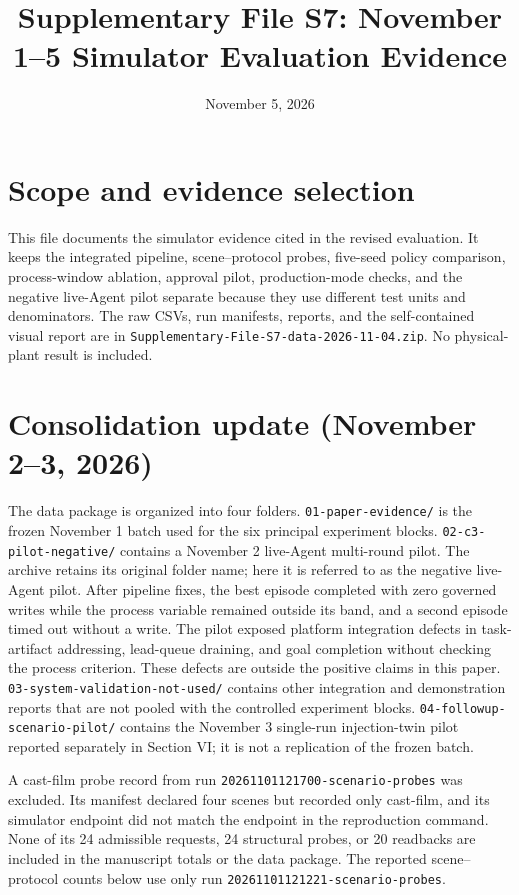 \documentclass[10pt]{article}
\title{Supplementary File S7: November 1--5 Simulator Evaluation Evidence}
\author{}
\date{November 5, 2026}
\begin{document}
\maketitle

\section*{Scope and evidence selection}
This file documents the simulator evidence cited in the revised evaluation. It keeps the integrated pipeline, scene--protocol probes, five-seed policy comparison, process-window ablation, approval pilot, production-mode checks, and the negative live-Agent pilot separate because they use different test units and denominators. The raw CSVs, run manifests, reports, and the self-contained visual report are in \texttt{Supplementary-File-S7-data-2026-11-04.zip}. No physical-plant result is included.

\section*{Consolidation update (November 2--3, 2026)}
The data package is organized into four folders. \texttt{01-paper-evidence/} is the frozen November 1 batch used for the six principal experiment blocks. \texttt{02-c3-pilot-negative/} contains a November 2 live-Agent multi-round pilot. The archive retains its original folder name; here it is referred to as the negative live-Agent pilot. After pipeline fixes, the best episode completed with zero governed writes while the process variable remained outside its band, and a second episode timed out without a write. The pilot exposed platform integration defects in task-artifact addressing, lead-queue draining, and goal completion without checking the process criterion. These defects are outside the positive claims in this paper. \texttt{03-system-validation-not-used/} contains other integration and demonstration reports that are not pooled with the controlled experiment blocks. \texttt{04-followup-scenario-pilot/} contains the November 3 single-run injection-twin pilot reported separately in Section VI; it is not a replication of the frozen batch.

A cast-film probe record from run \texttt{20261101121700-scenario-probes} was excluded. Its manifest declared four scenes but recorded only cast-film, and its simulator endpoint did not match the endpoint in the reproduction command. None of its 24 admissible requests, 24 structural probes, or 20 readbacks are included in the manuscript totals or the data package. The reported scene--protocol counts below use only run \texttt{20261101121221-scenario-probes}.
\end{document}
